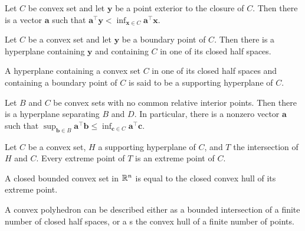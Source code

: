 \begin{theorem}
Let $C$ be convex set and let $\mathbf{y}$ be a point exterior to the closure of $C$. Then there is a vector $\mathbf{a}$ such that $\mathbf{a}^\top \mathbf{y}<\inf_{\mathbf{x}\in C} \mathbf{a}^\top \mathbf{x}$.
\end{theorem}

\begin{theorem}
Let $C$ be a convex set and let $\mathbf{y}$ be a boundary point of $C$. Then there is a hyperplane containing $\mathbf{y}$ and containing $C$ in one of its closed half spaces. 
\end{theorem}

\begin{definition}
A hyperplane containing a convex set $C$ in one of its closed half spaces and containing a boundary point of $C$ is said to be a supporting hyperplane of $C$.
\end{definition}

\begin{theorem}
Let $B$ and $C$ be convex sets with no common relative interior points. Then there is a hyperplane separating $B$ and $D$. In particular, there is a nonzero vector $\mathbf{a}$ such that $\sup_{\mathbf{b}\in B}\mathbf{a}^\top \mathbf{b}\leq \inf_{\mathbf{c}\in C} \mathbf{a}^\top \mathbf{c}$. 
\end{theorem}

\begin{theorem}
	Let $C$ be a convex set, $H$ a supporting hyperplane of $C$, and $T$ the intersection of $H$ and $C$. Every extreme point of $T$ is an extreme point of $C$.
\end{theorem}

\begin{theorem}
A closed bounded convex set in $\mathbb{R}^n$ is equal to the closed convex hull of its extreme point.
\end{theorem}

\begin{theorem}
A convex polyhedron can be described either as a bounded intersection of a finite number of closed half spaces, or a s the convex hull of a finite number of points. 
\end{theorem}